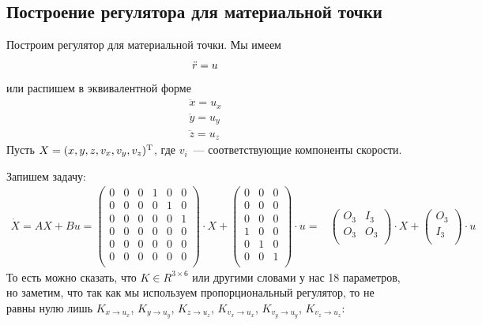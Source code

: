 \documentclass[a4paper,12pt]{article}
\begin{document}
\subsection{Построение регулятора для материальной точки}

Построим регулятор для материальной точки. Мы имеем
\begin{equation*}
    \Ddot{r} = u
\end{equation*}
или распишем в эквивалентной форме
\begin{align*}
    \ddot{x} = u_x \\
    \ddot{y} = u_y \\
    \ddot{z} = u_z
\end{align*}
Пусть $X = (x,y,z,v_x,v_y,v_z)^\text{\textup{T}}$, где $v_i$~--- соответствующие компоненты скорости.

Запишем задачу:
\begin{align*}
    \Dot{X} = AX + Bu =
            \begin{pmatrix}
                0& 0& 0& 1& 0& 0\\
                0& 0& 0& 0& 1& 0\\
                0& 0& 0& 0& 0& 1\\
                0& 0& 0& 0& 0& 0\\
                0& 0& 0& 0& 0& 0\\
                0& 0& 0& 0& 0& 0\\
            \end{pmatrix} 
            \cdot X +
            \begin{pmatrix}
                0& 0& 0\\
                0& 0& 0\\
                0& 0& 0\\
                1& 0& 0\\
                0& 1& 0\\
                0& 0& 1\\
            \end{pmatrix}
            \cdot u = 
            &\begin{pmatrix}
                O_3& I_3\\
                O_3& O_3\\ 
            \end{pmatrix}
            \cdot X +
            \begin{pmatrix}
                O_3\\
                I_3\\
            \end{pmatrix}
            \cdot u
\end{align*}
То есть можно сказать, что $K\in R^{3\times 6}$ или другими словами у нас 18 параметров, но заметим, что так как мы используем пропорциональный регулятор, то не равны нулю лишь $K_{x\rightarrow u_x}$, $K_{y\rightarrow u_y}$, $K_{z\rightarrow u_z}$, $K_{v_x\rightarrow u_x}$, $K_{v_y\rightarrow u_y}$, $K_{v_z\rightarrow u_z}$:
\end{document}
